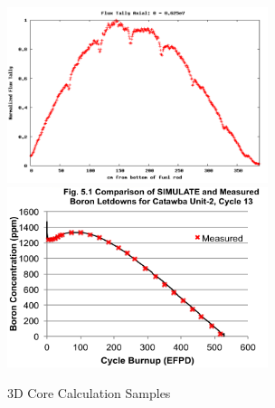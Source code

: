 \documentclass{school-22.211-notes}
\begin{document}
\begin{figure}[ht]
  \centering
  \includegraphics[width=3in]{images/methd/3Dcore-spacer.png}
  \includegraphics[width=3in]{images/methd/3Dcore-poison.png}
  \caption{3D Core Calculation Samples} \label{3Dcore}
\end{figure}
\end{document}
